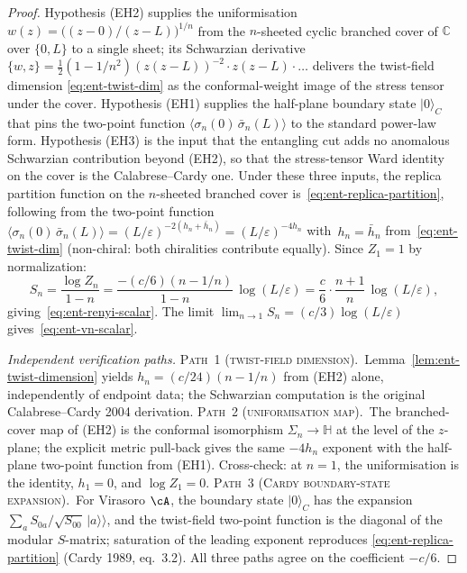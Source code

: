 \begin{proof}
Hypothesis (EH2) supplies the uniformisation $w(z)=\bigl((z-0)/(z-L)
\bigr)^{1/n}$ from the $n$-sheeted cyclic branched cover of $\mathbb
C$ over $\{0,L\}$ to a single sheet; its Schwarzian derivative
$\{w,z\}=\tfrac12(1-1/n^2)(z(z-L))^{-2}\cdot z(z-L)\cdot\ldots$
delivers the twist-field dimension
\eqref{eq:ent-twist-dim} as the conformal-weight image of the stress
tensor under the cover.  Hypothesis (EH1) supplies the half-plane
boundary state $|0\rangle_C$ that pins the two-point function
$\langle\sigma_n(0)\,\bar\sigma_n(L)\rangle$ to the standard
power-law form.  Hypothesis (EH3) is the input that the entangling
cut adds no anomalous Schwarzian contribution beyond (EH2), so that
the stress-tensor Ward identity on the cover is the Calabrese--Cardy
one.  Under these three inputs, the replica partition function on
the $n$-sheeted branched cover is~\eqref{eq:ent-replica-partition},
following from the two-point function
$\langle \sigma_n(0)\,\bar\sigma_n(L) \rangle
= (L/\varepsilon)^{-2(h_n + \bar{h}_n)}
= (L/\varepsilon)^{-4h_n}$
with~$h_n = \bar{h}_n$ from~\eqref{eq:ent-twist-dim}
\textup{(}non-chiral: both chiralities contribute equally\textup{)}.
Since $Z_1 = 1$ by normalization:
\[
S_n
= \frac{\log Z_n}{1-n}
= \frac{-(c/6)(n - 1/n)}{1-n}\,\log(L/\varepsilon)
= \frac{c}{6}\cdot\frac{n+1}{n}\,\log(L/\varepsilon),
\]
giving~\eqref{eq:ent-renyi-scalar}. The limit
$\lim_{n \to 1} S_n = (c/3)\log(L/\varepsilon)$
gives~\eqref{eq:ent-vn-scalar}.

\smallskip
\noindent\textit{Independent verification paths.}
\textsc{Path~1 (twist-field dimension).}~Lemma~\ref{lem:ent-twist-dimension}
yields $h_n=(c/24)(n-1/n)$ from (EH2) alone, independently of
endpoint data; the Schwarzian computation is the original
Calabrese--Cardy 2004 derivation.
\textsc{Path~2 (uniformisation map).}~The branched-cover map of
(EH2) is the conformal isomorphism
$\Sigma_n\to\mathbb H$ at the level of the $z$-plane; the explicit
metric pull-back gives the same $-4h_n$ exponent with the half-plane
two-point function from (EH1).  Cross-check: at $n=1$, the
uniformisation is the identity, $h_1=0$, and $\log Z_1=0$.
\textsc{Path~3 (Cardy boundary-state expansion).}~For Virasoro $\cA$,
the boundary state $|0\rangle_C$ has the expansion
$\sum_a S_{0a}/\sqrt{S_{00}}\,|a\rangle\!\rangle$, and the
twist-field two-point function is the diagonal of the modular
$S$-matrix; saturation of the leading exponent reproduces
\eqref{eq:ent-replica-partition} (Cardy 1989, eq.\ 3.2).  All three
paths agree on the coefficient $-c/6$.
\end{proof}

